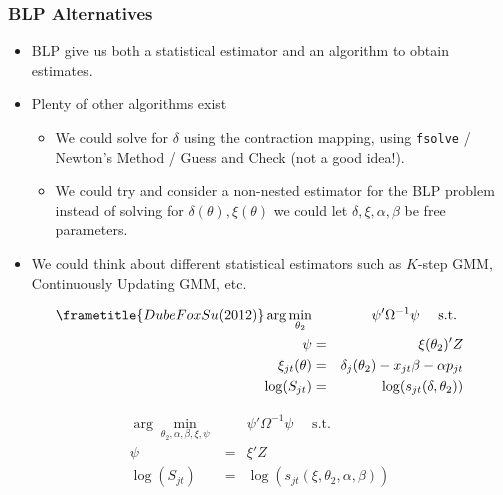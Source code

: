 \documentclass[xcolor=pdftex,dvipsnames,table,mathserif,aspectratio=169]{beamer}
\begin{document}
 \begin{frame}
\frametitle{BLP Alternatives}
\begin{itemize}
 \item BLP give us both a statistical \alert{estimator} and an \alert{algorithm} to obtain estimates.
\item Plenty of other algorithms exist
\begin{itemize}
\item We could solve for $\delta$ using the contraction mapping, using \texttt{fsolve} / Newton's Method / Guess and Check (not a good idea!).
\item We could try and consider a non-nested estimator for the BLP problem instead of solving for $\delta(\theta),\xi(\theta)$ we could let $\delta,\xi,\alpha,\beta$ be free parameters.
 \end{itemize}
\item We could think about different statistical estimators such as $K$-step GMM, Continuously Updating GMM, etc.
 \end{itemize}
\end{frame}
 \begin{frame}
 
\begin{eqnarray}
\frametitle{Dube Fox Su (2012)}
\label{blpnfxp}
\nonumber \arg \min_{\theta_2} && \psi' \Omega^{-1} \psi \quad \mbox{ s.t. } \\
\nonumber \psi &=& \xi(\theta_2)' Z\\
\xi_{jt}(\theta) &=& \delta_j(\theta_2) - x_{jt} \beta - \alpha p_{jt} \\
\nonumber \log(S_{jt})  &=& \log(s_{jt}(\delta,\theta_2))
\end{eqnarray}

\begin{eqnarray}
\label{blpmpec}
\nonumber \arg \min_{\theta_2,\alpha,\beta, \xi,\psi} && \psi' \Omega^{-1}  \psi \quad \mbox{ s.t. } \\
 \psi &=& \xi' Z\\
\nonumber \log(S_{jt})  &=& \log(s_{jt}(\xi,\theta_2, \alpha, \beta))
\end{eqnarray}
\end{frame}
\end{document}
